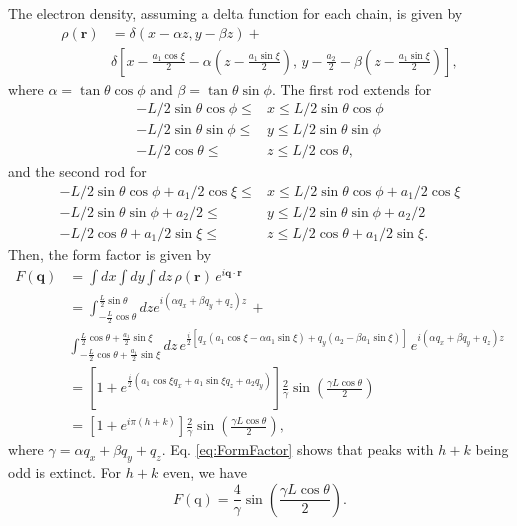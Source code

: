The electron density, assuming a delta function for each chain, is given by 
\begin{align}
	\rho(\mathbf{r})&=\delta(x-\alpha z, y-\beta z)+\\
	&\delta\left[x-\frac{a_1\cos\xi}{2}-\alpha\left(z-\frac{a_1\sin\xi}{2}\right),\, y-\frac{a_2}{2}-\beta\left(z-\frac{a_1\sin\xi}{2}\right)\right],
\end{align}
where $\alpha=\tan\theta\cos\phi$ and $\beta=\tan\theta\sin\phi$. The first rod extends for
\begin{align}%
	-L/2\sin\theta\cos\phi\leq &x\leq L/2\sin\theta\cos\phi\\ 
	-L/2\sin\theta\sin\phi\leq &y \leq L/2\sin\theta\sin\phi\\
	-L/2\cos\theta\leq &z \leq L/2\cos\theta,
\end{align}
and the second rod for
\begin{align}%
	-L/2\sin\theta\cos\phi+a_1/2\cos\xi\leq &x\leq L/2\sin\theta\cos\phi+a_1/2\cos\xi\\ 
	-L/2\sin\theta\sin\phi+a_2/2 \leq &y \leq L/2\sin\theta\sin\phi+a_2/2\\
	-L/2\cos\theta+a_1/2\sin\xi \leq &z \leq L/2\cos\theta+a_1/2\sin\xi.
\end{align}
Then, the form factor is given by
\begin{align}%
	F(\mathbf{q})&=\int dx\int dy\int dz\,\rho(\mathbf{r})\,e^{i\mathbf{q}\cdot\mathbf{r}}\\
	&=\int_{-\frac{L}{2}\cos\theta}^{\frac{L}{2}\sin\theta}dz e^{i(\alpha q_x+\beta q_y+q_z)z}\,+\nonumber\\
	&\int_{-\frac{L}{2}\cos\theta+\frac{a_1}{2}\sin\xi}^{\frac{L}{2}\cos\theta+\frac{a_1}{2}\sin\xi}dz\, e^{\frac{i}{2}\left[q_x\left(a_1\cos\xi-\alpha a_1\sin\xi\right)+q_y\left(a_2-\beta a_1\sin\xi\right)\right]}\,e^{i(\alpha q_x+\beta q_y+q_z)z}\nonumber\\
	&=\left[1+e^{\frac{i}{2}\left(a_1\cos\xi q_x+a_1\sin\xi q_z+a_2q_y\right)}\right]\frac{2}{\gamma}\sin\left(\frac{\gamma L\cos\theta}{2}\right)\nonumber\\
	&=\left[1+e^{i\pi(h+k)}\right]\frac{2}{\gamma}\sin\left(\frac{\gamma L\cos\theta}{2}\right)\label{eq:FormFactor},
\end{align}
where $\gamma=\alpha q_x+\beta q_y+q_z$. Eq. \ref{eq:FormFactor} shows that peaks with $h+k$ being odd is extinct. For $h+k$ even, we have
\begin{equation}%
	F(\mathrm{q})=\frac{4}{\gamma}\sin\left(\frac{\gamma L\cos\theta}{2}\right)\label{eq:FormFactorEven}.
\end{equation} 

